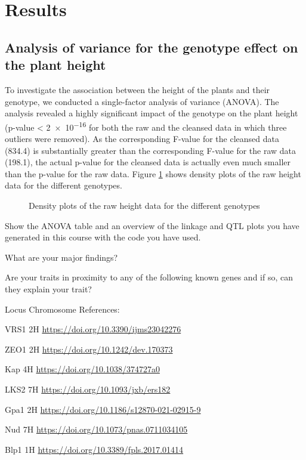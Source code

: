 \section{Results}

\subsection{Analysis of variance for the genotype effect on the plant height}

To investigate the association between the height of the plants and their genotype, we conducted a single-factor analysis of variance (ANOVA). The analysis revealed a highly significant impact of the genotype on the plant height (p-value < \num{2e-16} for both the raw and the cleansed data in which three outliers were removed). As the corresponding F-value for the cleansed data (\num{834.4}) is substantially greater than the corresponding F-value for the raw data (\num{198.1}), the actual p-value for the cleansed data is actually even much smaller than the p-value for the raw data. Figure \ref{fig:raw_genotype_height} shows density plots of the raw height data for the different genotypes.

\begin{figure}[htbp]
    
    \caption{Density plots of the raw height data for the different genotypes}
    \label{fig:raw_genotype_height}
\end{figure}


Show the ANOVA table and an overview of the linkage and QTL plots you have generated in this course with the code you have used.

What are your major findings?

Are your traits in proximity to any of the following known genes and if so, can they explain your trait?

Locus Chromosome References:

VRS1 2H \url{https://doi.org/10.3390/ijms23042276}

ZEO1 2H \url{https://doi.org/10.1242/dev.170373}

Kap 4H \url{https://doi.org/10.1038/374727a0}

LKS2 7H \url{https://doi.org/10.1093/jxb/ers182}

Gpa1 2H \url{https://doi.org/10.1186/s12870-021-02915-9}

Nud 7H \url{https://doi.org/10.1073/pnas.0711034105}

Blp1 1H \url{https://doi.org/10.3389/fpls.2017.01414}
